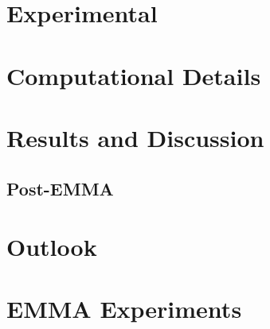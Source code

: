 \documentclass[a4paper]{article}
\begin{document}
\section{Experimental}
\label{sec:exp}


\section{Computational Details}
\label{sec:comp}
%

\section{Results and Discussion}
\label{sec:results}
%
%
\subsection{Post-EMMA}

%

\section{Outlook}
\label{sec:outlook}
%




\clearpage

\appendix
\section{EMMA Experiments}
\label{sec:app-emma}

\end{document}
